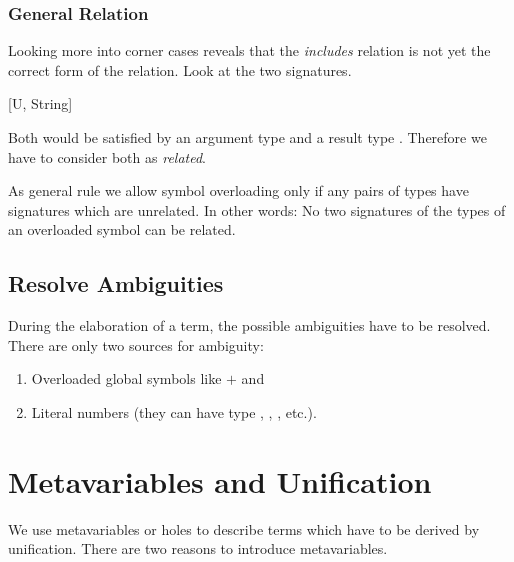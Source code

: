 \subsubsection{General Relation}

Looking more into corner cases reveals that the \emph{includes} relation is not
yet the correct form of the relation. Look at the two signatures.
%
\begin{alba}
    [Int, U]

    [U, String]
\end{alba}

Both would be satisfied by an argument type  and a result type
. Therefore we have to consider both as \emph{related}.

As general rule we allow symbol overloading only if any pairs of types have
signatures which are unrelated. In other words: No two signatures of the types
of an overloaded symbol can be related.










\subsection{Resolve Ambiguities}

During the elaboration of a term, the possible ambiguities have to be resolved.
There are only two sources for ambiguity:
%
\begin{enumerate}

\item Overloaded global symbols like $+$ and 

\item Literal numbers (they can have type , ,
, etc.).

\end{enumerate}








\section{Metavariables and Unification}

We use metavariables or holes to describe terms which have to be derived by
unification. There are two reasons to introduce metavariables.

